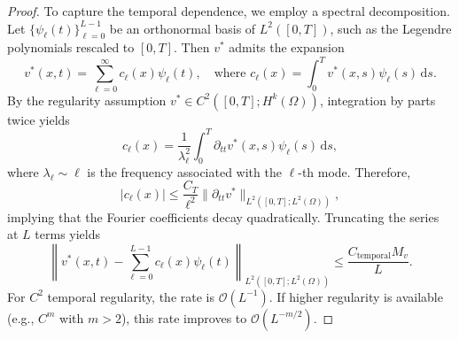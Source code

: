 \documentclass[11pt,reqno]{amsart}
\theoremstyle{plain}
\theoremstyle{definition}
\theoremstyle{remark}
\begin{document}
\begin{proof}
\noindent To capture the temporal dependence, we employ a spectral decomposition. Let $\{\psi_\ell(t)\}_{\ell=0}^{L-1}$ be an orthonormal basis of $L^2([0,T])$, such as the Legendre polynomials rescaled to $[0,T]$. Then $v^*$ admits the expansion
\begin{equation}
    v^*(x,t) = \sum_{\ell=0}^{\infty} c_\ell(x) \psi_\ell(t), \quad \text{where } c_\ell(x) = \int_0^T v^*(x,s) \psi_\ell(s) \, \mathrm{d}s.
\end{equation}
By the regularity assumption $v^* \in C^2([0,T]; H^k(\Omega))$, integration by parts twice yields
\begin{equation}
    c_\ell(x) = \frac{1}{\lambda_\ell^2} \int_0^T \partial_{tt} v^*(x,s) \psi_\ell(s) \, \mathrm{d}s,
\end{equation}
where $\lambda_\ell \sim \ell$ is the frequency associated with the $\ell$-th mode. Therefore,
\begin{equation}
    |c_\ell(x)| \leq \frac{C_T}{\ell^2} \|\partial_{tt} v^*\|_{L^2([0,T]; L^2(\Omega))},
\end{equation}
implying that the Fourier coefficients decay quadratically. Truncating the series at $L$ terms yields
\begin{equation}\label{eq:temporal_approx}
    \left\| v^*(x,t) - \sum_{\ell=0}^{L-1} c_\ell(x) \psi_\ell(t) \right\|_{L^2([0,T]; L^2(\Omega))} \leq \frac{C_{\mathrm{temporal}} M_v}{L}.
\end{equation}
For $C^2$ temporal regularity, the rate is $\mathcal{O}(L^{-1})$. If higher regularity is available (e.g., $C^m$ with $m > 2$), this rate improves to $\mathcal{O}(L^{-m/2})$.

\medskip
{}


\end{proof}
\end{document}
